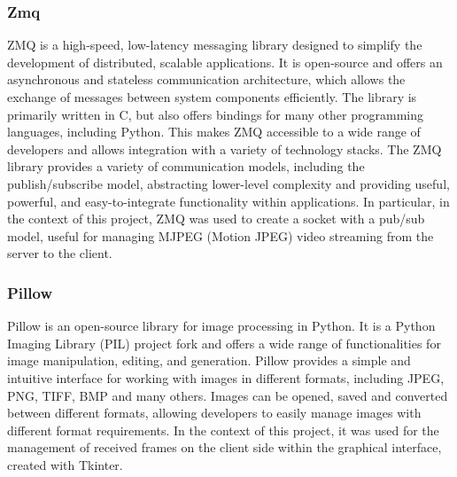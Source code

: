 \documentclass[a4paper,11pt]{report}
\theoremstyle{definition}
\theoremstyle{plain}
\begin{document}
            \subsubsection{Zmq}
                ZMQ is a high-speed, low-latency messaging library designed to simplify the development of distributed, scalable applications. It is open-source and offers an asynchronous and stateless communication architecture, which allows the exchange of messages between system components efficiently.\newline
                The library is primarily written in C, but also offers bindings for many other programming languages, including Python. This makes ZMQ accessible to a wide range of developers and allows integration with a variety of technology stacks.\newline
                The ZMQ library provides a variety of communication models, including the publish/subscribe model, abstracting lower-level complexity and providing useful, powerful, and easy-to-integrate functionality within applications. In particular, in the context of this project, ZMQ was used to create a socket with a pub/sub model, useful for managing MJPEG (Motion JPEG) video streaming from the server to the client.
            \subsubsection{Pillow}
                Pillow is an open-source library for image processing in Python. It is a Python Imaging Library (PIL) project fork and offers a wide range of functionalities for image manipulation, editing, and generation.\newline
                Pillow provides a simple and intuitive interface for working with images in different formats, including JPEG, PNG, TIFF, BMP and many others. Images can be opened, saved and converted between different formats, allowing developers to easily manage images with different format requirements. In the context of this project, it was used for the management of received frames on the client side within the graphical interface, created with Tkinter.
\end{document}
